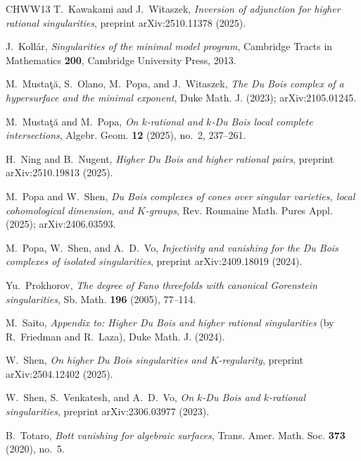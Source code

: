 \documentclass[11pt]{amsart}
\numberwithin{equation}{section}
\theoremstyle{plain}
\theoremstyle{definition}
\theoremstyle{remark}
\begin{document}
\begin{thebibliography}{CHWW13}
T.~Kawakami and J.~Witaszek,
\emph{Inversion of adjunction for higher rational singularities},
preprint arXiv:2510.11378 (2025).

J.~Koll\'ar,
\emph{Singularities of the minimal model program},
Cambridge Tracts in Mathematics \textbf{200}, Cambridge University Press, 2013.

M.~Musta\c{t}\u{a}, S.~Olano, M.~Popa, and J.~Witaszek,
\emph{The Du Bois complex of a hypersurface and the minimal exponent},
Duke Math. J. (2023); arXiv:2105.01245.

M.~Musta\c{t}\u{a} and M.~Popa,
\emph{On $k$-rational and $k$-Du Bois local complete intersections},
Algebr. Geom. \textbf{12} (2025), no.~2, 237--261.

H.~Ning and B.~Nugent,
\emph{Higher Du Bois and higher rational pairs},
preprint arXiv:2510.19813 (2025).

M.~Popa and W.~Shen,
\emph{Du Bois complexes of cones over singular varieties, local cohomological dimension, and $K$-groups},
Rev. Roumaine Math. Pures Appl. (2025); arXiv:2406.03593.

M.~Popa, W.~Shen, and A.~D.~Vo,
\emph{Injectivity and vanishing for the Du Bois complexes of isolated singularities},
preprint arXiv:2409.18019 (2024).

Yu.~Prokhorov,
\emph{The degree of Fano threefolds with canonical Gorenstein singularities},
Sb. Math. \textbf{196} (2005), 77--114.

M.~Saito,
\emph{Appendix to: Higher Du Bois and higher rational singularities} (by R.~Friedman and R.~Laza),
Duke Math. J. (2024).

W.~Shen,
\emph{On higher Du Bois singularities and $K$-regularity},
preprint arXiv:2504.12402 (2025).

W.~Shen, S.~Venkatesh, and A.~D.~Vo,
\emph{On $k$-Du Bois and $k$-rational singularities},
preprint arXiv:2306.03977 (2023).

B.~Totaro,
\emph{Bott vanishing for algebraic surfaces},
Trans. Amer. Math. Soc. \textbf{373} (2020), no.~5.

\end{thebibliography}
\end{document}
